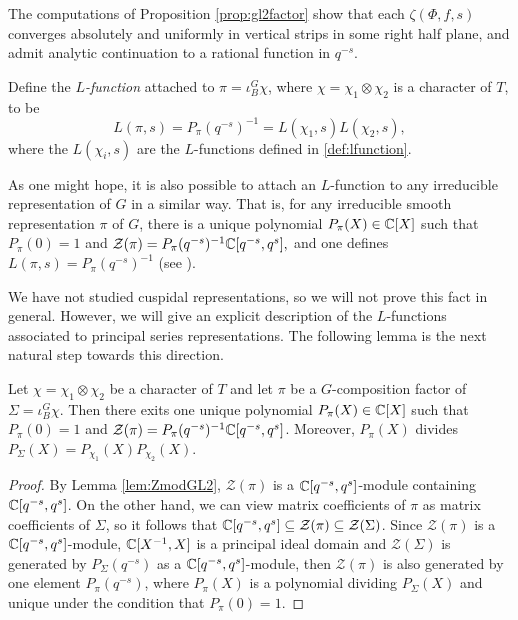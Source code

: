 \begin{rem}
    The computations of Proposition \ref{prop:gl2factor} show that each $\zeta(\Phi,f,s)$ converges absolutely and uniformly in vertical strips in some right half plane, and admit analytic continuation to a rational function in $q^{-s}$.
\end{rem}


\begin{defn}
    Define the \textit{$L$-function} attached to $\pi = \iota_B^G \chi$, where $\chi=\chi_1\otimes \chi_2$ is a character of $T$, to be $$L(\pi,s) = P_\pi(q^{-s})^{-1} = L(\chi_1,s)L(\chi_2,s),$$
    where the $L(\chi_i,s)$ are the $L$-functions defined
    in \ref{def:lfunction}.
\end{defn}

\begin{rem}\label{BHThm1}
    As one might hope, it is also possible to attach an $L$-function to any irreducible representation of $G$ in a similar way. That is, for any irreducible smooth representation $\pi$ of $G$, there is a unique polynomial $P_\pi(X)\in\mathbb{C}[X]$ such that $P_\pi(0)=1$ and $\mathcal Z(\pi) = P_\pi(q^{-s})^{-1} \mathbb{C}[q^{-s},q^s],$ and one defines $L(\pi,s)=P_\pi(q^{-s})^{-1}$ (see \cite[Theorem 24.2.1]{BH1}).
\end{rem}

We have not studied cuspidal representations, so we will not prove this fact in general. However, we will give an explicit description of the $L$-functions associated to principal series representations. The following lemma is the next natural step towards this direction.

\begin{lemma}
    Let $\chi=\chi_1\otimes\chi_2$ be a character of $T$ and let $\pi$ be a $G$-composition factor of $\Sigma=\iota_B^G\chi$. Then there exits one unique polynomial $P_\pi(X)\in\mathbb{C}[X]$ such that $P_\pi(0)=1$ and $\mathcal{Z}(\pi)=P_\pi(q^{-s})^{-1}\mathbb{C}[q^{-s},q^s]$. Moreover, $P_\pi(X)$ divides $P_\Sigma(X)=P_{\chi_1}(X)P_{\chi_2}(X)$.
\end{lemma}
\begin{proof}
    By Lemma \ref{lem:ZmodGL2}, $\mathcal{Z}(\pi)$ is a $\mathbb{C}[q^{-s},q^s]$-module containing $\mathbb{C}[q^{-s},q^s]$. On the other hand, we can view matrix coefficients of $\pi$ as matrix coefficients of $\Sigma$, so it follows that $\mathbb{C}[q^{-s},q^s]\subseteq\mathcal{Z}(\pi)\subseteq\mathcal{Z}(\Sigma)$. Since $\mathcal{Z}(\pi)$ is a $\mathbb{C}[q^{-s},q^s]$-module, $\mathbb{C}[X^{-1},X]$ is a principal ideal domain and $\mathcal{Z}(\Sigma)$ is generated by $P_\Sigma(q^{-s})$ as a $\mathbb{C}[q^{-s},q^s]$-module, then $\mathcal{Z}(\pi)$ is also generated by one element $P_\pi(q^{-s})$, where $P_\pi(X)$ is a polynomial dividing $P_\Sigma(X)$ and unique under the condition that $P_\pi(0)=1$.
\end{proof}

